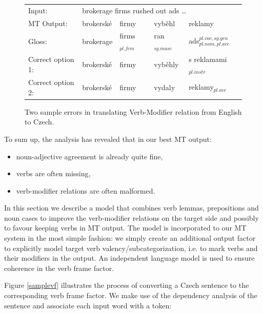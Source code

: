 \documentclass[10pt]{report}
\theoremstyle{plain}
\begin{document}
{{\begin{figure}
\begin{center}
{
\small
\begin{tabular}{|lllll|}
\hline
Input:  &  \multicolumn{4}{l|}{brokerage firms rushed out ads \dots}\\
MT Output:  &  brokersk\'{e}  &  firmy  &  vyb\v{e}hl  &  reklamy\\
Gloss:  &  brokerage  &  firms$_{pl.fem}$  &  ran$_{sg.masc}$  &  ads$_{pl.nom,pl.acc}^{pl.voc,sg.gen}$\\
Correct option 1:  &  brokersk\'{e}  &  firmy  &  vyb\v{e}hly  &  s reklamami$_{pl.instr}$\\
Correct option 2:  &  brokersk\'{e}  &  firmy  &  vydaly  &  reklamy$_{pl.acc}$\\
\hline
\end{tabular}
}
\end{center}
\caption{Two sample errors in translating Verb-Modifier relation from English to
Czech.}
\label{sampleerrors}
\end{figure}







To sum up, the analysis has revealed that in our best MT output:

\begin{itemize}

\item noun-adjective agreement is already quite fine,

\item verbs are often missing,

\item verb-modifier relations are often malformed.
\end{itemize}




In this section we describe a model that combines verb lemmas, prepositions and
noun cases to improve the verb-modifier relations on the target side and
possibly to favour keeping verbs in MT output. The model
is incorporated to our MT system in the most simple fashion: we simply create an
additional output factor to explicitly model target verb
valency/subcategorization, i.e. to mark verbs and their modifiers in the output.
An independent language model is used to ensure coherence in the verb frame
factor.

Figure \ref{samplevf} illustrates the process of converting a Czech sentence to
the corresponding verb frame factor. We make use of the dependency analysis of
the sentence and associate each input word with a token:

}}
\end{document}
